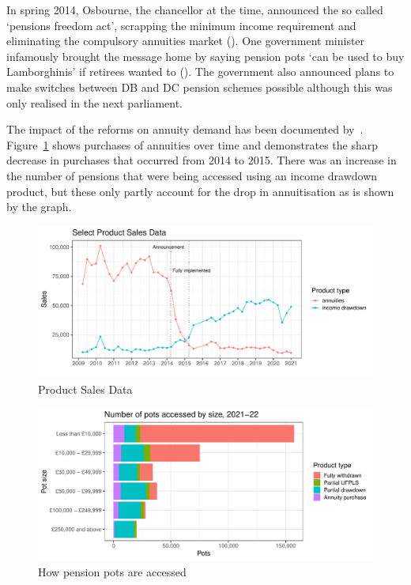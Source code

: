 \documentclass[12pt]{article}
\begin{document}
In spring 2014, Osbourne, the chancellor at the time, announced the so called
`pensions freedom act', scrapping the minimum income requirement and eliminating
the compulsory annuities market (\cite{pen-freedoms-hmt-2014}). One government
minister infamously brought the message home by saying pension pots `can be used
to buy Lamborghinis' if retirees wanted to (\cite{guardian-lambos}). The
government also announced plans to make switches between DB and DC pension
schemes possible although this was only realised in the next parliament.

The impact of the reforms on annuity demand has been documented by~\cite{cannon-et-al-nier-2016}.
Figure~\ref{fig:annovertime} shows purchases of annuities over time and demonstrates the sharp decrease in purchases
that occurred from 2014 to 2015.
There was an increase in the number of pensions that were being accessed using an income drawdown product, but these only partly account for the drop in annuitisation as is shown by the graph.

\begin{figure}[h]

  \centering
  \includegraphics[width=0.9\columnwidth]{figures/annuity_overtime.pdf}

  \caption{Product Sales Data}
  \label{fig:annovertime}
\end{figure}

\begin{figure}[h]

  \centering
  \includegraphics[width=0.9\columnwidth]{figures/annuity_pot_sizes.pdf}
  \caption[Caption for LOF]{How pension pots are accessed\protect\footnotemark}
  \label{fig:ann2122}
\end{figure}
\end{document}
